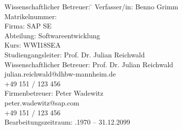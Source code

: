 \begin{titlepage}
\begin{center}
\begin{minipage}{\textwidth}
\begin{tabbing}
	Wissenschaftlicher Betreuer: \hspace{0.85cm}\=\kill
	Verfasser/in: \> Benno Grimm \\[1.5mm]
	Matrikelnummer:  \\[1.5mm]
	Firma: \> SAP SE  \\[1.5mm]
	Abteilung: \> Softwareentwicklung \\[1.5mm]
	Kurs: \> WWI18SEA \\[1.5mm]
	Studiengangsleiter: \> Prof. Dr. Julian Reichwald  \\[1.5mm]
	Wissenschaftlicher Betreuer: \> Prof. Dr. Julian Reichwald \\
	\> julian.reichwald@dhbw-mannheim.de \\
	\> +49 151 / 123 456 \\[1.5mm]
	Firmenbetreuer: \> Peter Wadewitz \\
	\> peter.wadewitz@sap.com \\
	\> +49 151 / 123 456 \\[1.5mm]
	Bearbeitungszeitraum: .1970 -- 31.12.2099
\end{tabbing}
\end{minipage}

\end{center}

\end{titlepage}